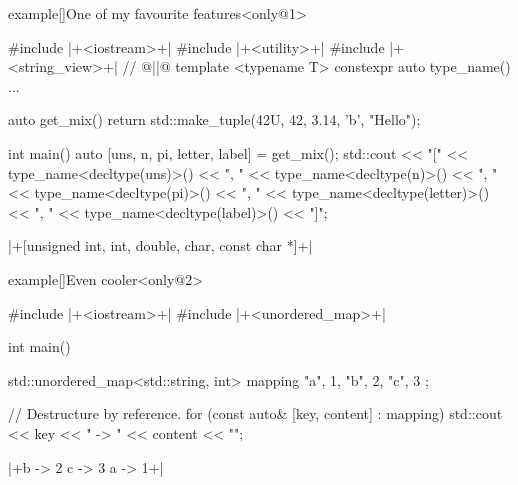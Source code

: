 \begin{frame}[fragile]{}
    \PrepareURLsymbol[red]
    \begin{varblock}{example}[\textwidth]{One of my favourite features}<only@1>
        \begin{Cpp}
            #include |+<iostream>+|
            #include |+<utility>+|
            #include |+<string_view>+| // @||@
            template <typename T> constexpr auto type_name() {...}

            auto get_mix()
            {
                return std::make_tuple(42U, 42, 3.14, 'b', "Hello");
            }

            int main(){
                auto [uns, n, pi, letter, label] = get_mix();
                std::cout << "[" << type_name<decltype(uns)>() << ", "
                          << type_name<decltype(n)>() << ", "
                          << type_name<decltype(pi)>() << ", "
                          << type_name<decltype(letter)>() << ", "
                          << type_name<decltype(label)>() << "]\n";
            }
        \end{Cpp}
        \smallskip
        \begin{Bash}[numbers=none]
            |+[unsigned int, int, double, char, const char *]+|
        \end{Bash}
    \end{varblock}
    \begin{varblock}{example}[\textwidth]{Even cooler}<only@2>
        \begin{Cpp}
            #include |+<iostream>+|
            #include |+<unordered_map>+|

            int main(){
                std::unordered_map<std::string, int> mapping {
                    {"a", 1},
                    {"b", 2},
                    {"c", 3}
                };

                // Destructure by reference.
                for (const auto& [key, content] : mapping) {
                    std::cout << key << " -> " << content << "\n";
                }
            }
        \end{Cpp}
        \smallskip
        \begin{Bash}[numbers=none]
            |+b -> 2
            c -> 3
            a -> 1+|
        \end{Bash}
    \end{varblock}
\end{frame}

